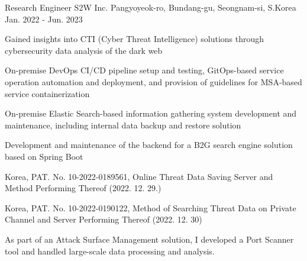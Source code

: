 

\begin{cventries}

  \cventry
    {Research Engineer} %
    {S2W Inc.} %
    {Pangyoyeok-ro, Bundang-gu, Seongnam-si, S.Korea} %
    {Jan. 2022 - Jun. 2023} %
    {
      \begin{cvitems} %
        \item {Gained insights into CTI (Cyber Threat Intelligence) solutions through cybersecurity data analysis of the dark web}
        \item {On-premise DevOps CI/CD pipeline setup and testing, GitOps-based service operation automation and deployment, and provision of guidelines for MSA-based service containerization}
        \item {On-premise Elastic Search-based information gathering system development and maintenance, including internal data backup and restore solution}
        \item {Development and maintenance of the backend for a B2G search engine solution based on Spring Boot}
        \item {Korea, PAT. No. 10-2022-0189561, Online Threat Data Saving Server and Method Performing Thereof (2022. 12. 29.)}
        \item {Korea, PAT. No. 10-2022-0190122, Method of Searching Threat Data on Private Channel and Server Performing Thereof (2022. 12. 30)}
        \item {As part of an Attack Surface Management solution, I developed a Port Scanner tool and handled large-scale data processing and analysis.}
      \end{cvitems}
    }


\end{cventries}
